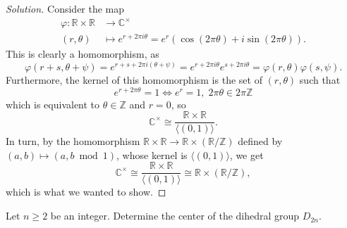 \documentclass[11pt]{scrartcl}
\providecommand{\CC}{\mathbb C}
\providecommand{\RR}{\mathbb R}
\providecommand{\ZZ}{\mathbb Z}
\newenvironment{soln}{\begin{proof}[Solution]}{\end{proof}}
\begin{document}
\begin{soln}
    Consider the map
    \begin{align*}
        \varphi\colon \RR\times\RR &\to \CC^\times \\
	(r,\theta) &\mapsto e^{r + 2\pi i\theta} =
	e^r(\cos(2\pi\theta) + i\sin(2\pi\theta)).
    \end{align*}
    This is clearly a homomorphism, as
    \begin{equation*}
	\varphi(r+s,\theta+\psi) = e^{r+s + 2\pi i(\theta + \psi)}
	= e^{r + 2\pi i\theta} e^{s+2\pi i\theta}
	= \varphi(r,\theta)\varphi(s,\psi).
    \end{equation*}
    Furthermore, the kernel of this homomorphism is the set of $(r,\theta)$ such that
    \begin{equation*}
	e^{r + 2\pi\theta} = 1 \iff e^r = 1,\; 2\pi\theta\in 2\pi\ZZ
    \end{equation*}
    which is equivalent to $\theta\in\ZZ$ and $r = 0$, so
    \begin{equation*}
	\CC^\times\cong\frac{\RR\times\RR}{\langle (0,1)\rangle}.
    \end{equation*}
    In turn, by the homomorphism $\RR\times\RR\to\RR\times(\RR/\ZZ)$
    defined by $(a,b)\mapsto (a,b\bmod 1)$, whose kernel is
    $\langle (0,1)\rangle$, we get
    \begin{equation*}
	\CC^\times\cong\frac{\RR\times\RR}{\langle (0,1)\rangle}
	\cong \RR\times(\RR/\ZZ),
    \end{equation*}
    which is what we wanted to show.
\end{soln}

\pagebreak

\begin{problem}
    Let $n\ge 2$ be an integer. Determine the center
    of the dihedral group $D_{2n}$.
\end{problem}
\end{document}
